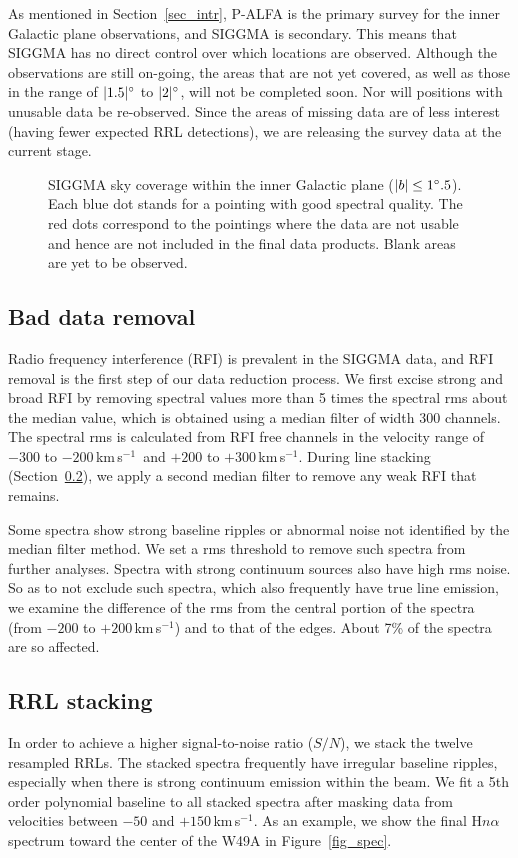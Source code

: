\documentclass[manuscript]{aastex61}
\newcommand{\kms}{\,km\,s$^{-1}$}
\begin{document}
As mentioned in Section~\ref{sec_intr}, P-ALFA is the primary survey for the inner Galactic plane observations, and SIGGMA is secondary.
This means that SIGGMA has no direct control over which locations are observed.  Although the observations are still on-going, the areas that are not yet covered, as well as those in the range of $|1.5|\mbox{$^\circ$}$ to $|2|\mbox{$^\circ$}$, will not be completed soon.  Nor will positions with unusable data be re-observed.
Since the areas of missing data are of less interest (having fewer expected RRL detections), we are releasing the survey data at the current stage.

\begin{figure}[hbtp]
\caption{SIGGMA sky coverage within the inner Galactic plane ($|b| \leq 1\mbox{$^\circ$}.5$).
Each blue dot stands for a pointing with good spectral quality.
The red dots correspond to the pointings where the data are not usable and hence are not included in the final data products.
Blank areas are yet to be observed.
}\label{fig_skycover}
\end{figure}

\subsection{Bad data removal} \label{sec_rfi}
Radio frequency interference (RFI) is prevalent in the SIGGMA data, and
RFI removal is the first step of our data reduction process.
We first excise strong and broad RFI by removing spectral values more than 5 times the spectral rms about the median value, which is obtained using a median filter of width 300 channels.
The spectral rms is calculated from RFI free channels in the velocity range of $-300$ to $-200$\kms\ and $+200$ to $+300$\kms.
During line stacking (Section~\ref{sec_stack}), we apply a second median filter to remove any weak RFI that remains.

Some spectra show strong baseline ripples or abnormal noise not identified by the median filter method.
We set a rms threshold to remove such spectra from further analyses.
Spectra with strong continuum sources also have high rms noise. 
So as to not exclude such spectra, which also frequently have true line emission, we examine the difference of the rms from the central portion of the spectra (from $-200$ to $+200$\kms) and to that of the edges.
About 7\% of the spectra are so affected.

\subsection{RRL stacking} \label{sec_stack}
In order to achieve a higher signal-to-noise ratio ($S/N$), we stack the twelve resampled RRLs.
The stacked spectra frequently have irregular baseline ripples, especially when there is strong continuum emission within the beam.
We fit a 5th order polynomial baseline to all stacked spectra after masking data from velocities between $-50$ and $+150$\kms.
As an example, we show the final H$n\alpha$ spectrum toward the center of the W49A in Figure~\ref{fig_spec}.
\end{document}
